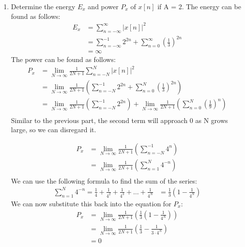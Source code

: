 \documentclass{article}
\begin{document}
\begin{enumerate}[label=\alph*.]
    \item Determine the energy $E_x$ and power $P_x$ of $x[n]$ if A = 2.
    The energy can be found as follows:
    \begin{align*}
        E_x &= \sum_{n=-\infty}^{\infty} |x[n]|^2 \\
        &= \sum_{n=-\infty}^{-1} 2^{2n} + \sum_{n=0}^{\infty} \left(\frac{1}{3}\right)^{2n} \\
        &= \infty
    \end{align*}
    The power can be found as follows:
    \begin{align*}
        P_x &= \lim_{N \to \infty} \frac{1}{2N + 1} \sum_{n=-N}^{N} |x[n]|^2 \\
        &= \lim_{N \to \infty} \frac{1}{2N + 1} \left(\sum_{n=-N}^{-1} 2^{2n} + \sum_{n=0}^{N} \left(\frac{1}{3}\right)^{2n}\right) \\
        &= \lim_{N \to \infty} \frac{1}{2N + 1} \left(\sum_{n=-N}^{-1} 2^{2n}\right) + 
        \lim_{N \to \infty} \frac{1}{2N+1}\left(\sum_{n=0}^{N} \left(\frac{1}{9}\right)^{n}\right)\\
    \end{align*}
    Similar to the previous part, the second term will approach 0 as N grows large, so we can disregard it.

    \begin{align*}
        P_x &= \lim_{N \to \infty} \frac{1}{2N + 1} \left(\sum_{n=-N}^{-1} 4^n\right) \\
        &= \lim_{N \to \infty} \frac{1}{2N + 1} \left(\sum_{n=1}^{N} 4^{-n}\right) \\
    \end{align*}
    We can use the following formula to find the sum of the series:
    \begin{align*}
        \sum_{n=1}^{N} 4^{-n} = \frac{1}{4} + \frac{1}{4^2} + \frac{1}{4^3} + \ldots + \frac{1}{4^N} &= \frac{1}{3}\left(1 - \frac{1}{4^N}\right)
    \end{align*}
    We can now substitute this back into the equation for $P_x$:
    \begin{align*}
        P_x &= \lim_{N \to \infty} \frac{1}{2N + 1} \left(\frac{1}{3}\left(1 - \frac{1}{4^N}\right)\right) \\
        &= \lim_{N \to \infty} \frac{1}{2N + 1} \left(\frac{1}{3} - \frac{1}{3 \cdot 4^N}\right) \\
        &= 0
    \end{align*}

\end{enumerate}
\end{document}
